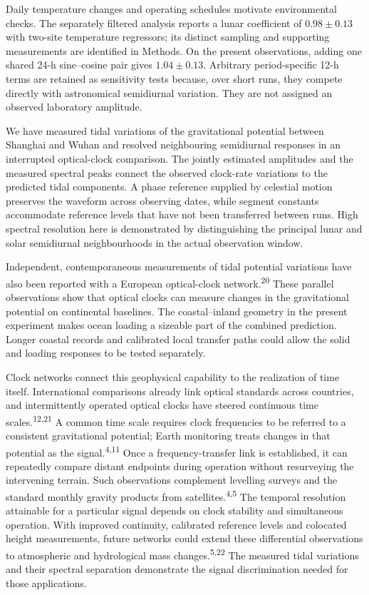 \documentclass[
  10pt,
  a4paper,
]{article}
\begin{document}
Daily temperature changes and operating schedules motivate environmental
checks. The separately filtered analysis reports a lunar coefficient of
\(0.98\pm0.13\) with two-site temperature regressors; its distinct
sampling and supporting measurements are identified in Methods. On the
present observations, adding one shared 24-h sine--cosine pair gives
\(1.04\pm0.13\). Arbitrary period-specific 12-h terms are retained as
sensitivity tests because, over short runs, they compete directly with
astronomical semidiurnal variation. They are not assigned an observed
laboratory amplitude.

We have measured tidal variations of the gravitational potential between
Shanghai and Wuhan and resolved neighbouring semidiurnal responses in an
interrupted optical-clock comparison. The jointly estimated amplitudes
and the measured spectral peaks connect the observed clock-rate
variations to the predicted tidal components. A phase reference supplied
by celestial motion preserves the waveform across observing dates, while
segment constants accommodate reference levels that have not been
transferred between runs. High spectral resolution here is demonstrated
by distinguishing the principal lunar and solar semidiurnal
neighbourhoods in the actual observation window.

Independent, contemporaneous measurements of tidal potential variations
have also been reported with a European optical-clock
network.\textsuperscript{20} These parallel observations show that
optical clocks can measure changes in the gravitational potential on
continental baselines. The coastal--inland geometry in the present
experiment makes ocean loading a sizeable part of the combined
prediction. Longer coastal records and calibrated local transfer paths
could allow the solid and loading responses to be tested separately.

Clock networks connect this geophysical capability to the realization of
time itself. International comparisons already link optical standards
across countries, and intermittently operated optical clocks have
steered continuous time scales.\textsuperscript{12,21} A common time
scale requires clock frequencies to be referred to a consistent
gravitational potential; Earth monitoring treats changes in that
potential as the signal.\textsuperscript{4,11} Once a frequency-transfer
link is established, it can repeatedly compare distant endpoints during
operation without resurveying the intervening terrain. Such observations
complement levelling surveys and the standard monthly gravity products
from satellites.\textsuperscript{4,5} The temporal resolution attainable
for a particular signal depends on clock stability and simultaneous
operation. With improved continuity, calibrated reference levels and
colocated height measurements, future networks could extend these
differential observations to atmospheric and hydrological mass
changes.\textsuperscript{5,22} The measured tidal variations and their
spectral separation demonstrate the signal discrimination needed for
those applications.
\end{document}
